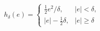 $h_{\delta}(e)=
\begin{cases}
\frac{1}{2}e^2/\delta, & |e|<\delta, \\
|e|-\frac{1}{2}\delta, & |e|\ge \delta
\end{cases}$
